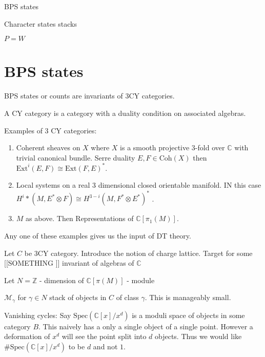 % 



\title{}
\author{Ben}
\date{}

 
\maketitle

BPS states 

Character states stacks 

$P = W$ 

\section{BPS states} %

\begin{definition}
    BPS states or counts are invariants of 3CY categories. 
\end{definition}

A CY category is a category with a duality condition on associated algebras.

Examples of 3 CY categories:
\begin{enumerate}
    \item Coherent sheaves on $X$ where $X$ is a smooth projective 3-fold over $ \mathbb{C} $ 
        with trivial canonical bundle. 
        Serre duality $E, F \in \mathrm{Coh} (X) $ then $ \mathrm{Ext} ^i (E, F)  \cong \mathrm{Ext}  ( F, E) ^* $.
    \item Local systems on a real 3 dimensional closed orientable manifold. 
        IN this case $ H^i * (M, E^* \otimes F ) \cong H ^{3-i } ( M, F^* \otimes E^* ) ^* $ .
    \item $M$ as above. Then Representations of $ \mathbb{C} [ \pi_1 ( M) ] $. 
\end{enumerate}
Any one of these examples gives us the input of DT theory. 

Let $ C $ be 3CY category. 
Introduce the notion of charge lattice. 
Target for some [[SOMETHING ]]  invariant of algebras of $ \mathbb{C} $ 

Let $ N = \mathbb{Z}  $ - dimension of $ \mathbb{C} [ \pi ( M) ] $ - module 

$ \mathcal{M} _\gamma $ for $ \gamma \in N $ stack of objects  in $ C $ of class $ \gamma $. 
This is manageably small. 

Vanishing cycles: Say $\mathrm{Spec} ( \mathbb{C} [x]/ x^d ) $ is a moduli space of objects in some category $B$. 
This naively has a only a single object of a single point. 
However a deformation of $x^d $ will see the point split into $d$ objects. 
Thus we would like $ \# \mathrm{Spec} ( \mathbb{C} [x]/ x^d ) $ to be $ d$ and not $1$. 

